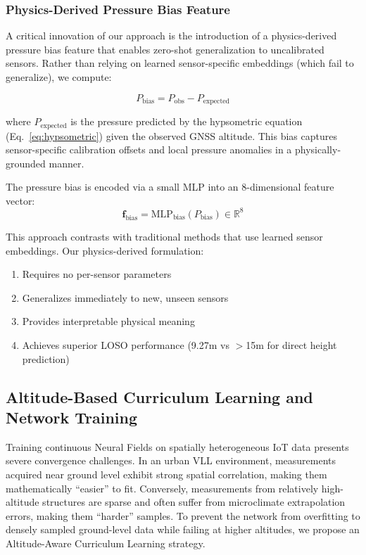 \subsubsection{Physics-Derived Pressure Bias Feature}
\label{subsec:bias_feature}

A critical innovation of our approach is the introduction of a physics-derived pressure bias feature that enables zero-shot generalization to uncalibrated sensors. Rather than relying on learned sensor-specific embeddings (which fail to generalize), we compute:

\begin{equation}
P_{\text{bias}} = P_{\text{obs}} - P_{\text{expected}}
\label{eq:pressure_bias}
\end{equation}

where $P_{\text{expected}}$ is the pressure predicted by the hypsometric equation (Eq.~\ref{eq:hypsometric}) given the observed GNSS altitude. This bias captures sensor-specific calibration offsets and local pressure anomalies in a physically-grounded manner.

The pressure bias is encoded via a small MLP into an 8-dimensional feature vector:
\begin{equation}
\mathbf{f}_{\text{bias}} = \text{MLP}_{\text{bias}}(P_{\text{bias}}) \in \mathbb{R}^8
\label{eq:bias_encoding}
\end{equation}

This approach contrasts with traditional methods that use learned sensor embeddings. Our physics-derived formulation:
\begin{enumerate}
    \item Requires no per-sensor parameters
    \item Generalizes immediately to new, unseen sensors
    \item Provides interpretable physical meaning
    \item Achieves superior LOSO performance (9.27m vs $>$15m for direct height prediction)
\end{enumerate}

\subsection{Altitude-Based Curriculum Learning and Network Training}
\label{subsec:curriculum_learning}

Training continuous Neural Fields on spatially heterogeneous IoT data presents severe convergence challenges. In an urban VLL environment, measurements acquired near ground level exhibit strong spatial correlation, making them mathematically ``easier'' to fit. Conversely, measurements from relatively high-altitude structures are sparse and often suffer from microclimate extrapolation errors, making them ``harder'' samples. To prevent the network from overfitting to densely sampled ground-level data while failing at higher altitudes, we propose an Altitude-Aware Curriculum Learning strategy.

